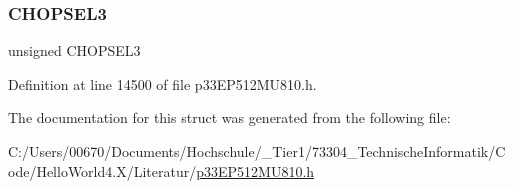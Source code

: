 \subsubsection{\texorpdfstring{C\+H\+O\+P\+S\+E\+L3}{CHOPSEL3}}
{\footnotesize\ttfamily unsigned C\+H\+O\+P\+S\+E\+L3}



Definition at line 14500 of file p33\+E\+P512\+M\+U810.\+h.



The documentation for this struct was generated from the following file\+:\begin{DoxyCompactItemize}
\item 
C\+:/\+Users/00670/\+Documents/\+Hochschule/\+\_\+\+Tier1/73304\+\_\+\+Technische\+Informatik/\+Code/\+Hello\+World4.\+X/\+Literatur/\hyperlink{p33_e_p512_m_u810_8h}{p33\+E\+P512\+M\+U810.\+h}\end{DoxyCompactItemize}
